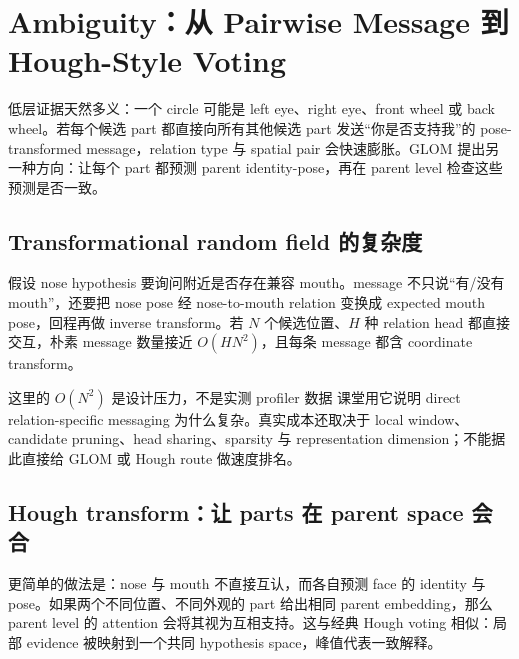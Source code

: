 \section{Ambiguity：从 Pairwise Message 到 Hough-Style Voting}

低层证据天然多义：一个 circle 可能是 left eye、right eye、front wheel 或 back wheel。若每个候选 part 都直接向所有其他候选 part 发送“你是否支持我”的 pose-transformed message，relation type 与 spatial pair 会快速膨胀。GLOM 提出另一种方向：让每个 part 都预测 parent identity-pose，再在 parent level 检查这些预测是否一致。


\subsection{Transformational random field 的复杂度}

假设 nose hypothesis 要询问附近是否存在兼容 mouth。message 不只说“有/没有 mouth”，还要把 nose pose 经 nose-to-mouth relation 变换成 expected mouth pose，回程再做 inverse transform。若 $N$ 个候选位置、$H$ 种 relation head 都直接交互，朴素 message 数量接近 $O(HN^2)$，且每条 message 都含 coordinate transform。

\begin{warningbox}{这里的 $O(N^2)$ 是设计压力，不是实测 profiler 数据}
课堂用它说明 direct relation-specific messaging 为什么复杂。真实成本还取决于 local window、candidate pruning、head sharing、sparsity 与 representation dimension；不能据此直接给 GLOM 或 Hough route 做速度排名。
\end{warningbox}

\subsection{Hough transform：让 parts 在 parent space 会合}

更简单的做法是：nose 与 mouth 不直接互认，而各自预测 face 的 identity 与 pose。如果两个不同位置、不同外观的 part 给出相同 parent embedding，那么 parent level 的 attention 会将其视为互相支持。这与经典 Hough voting 相似：局部 evidence 被映射到一个共同 hypothesis space，峰值代表一致解释。


